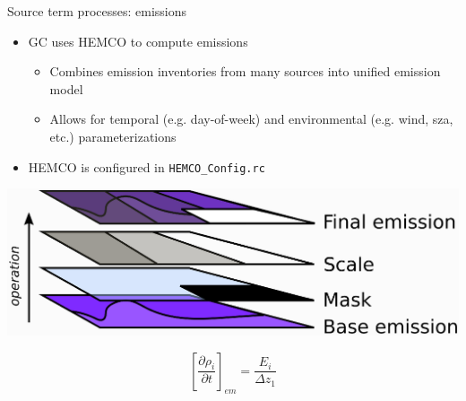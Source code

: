 \documentclass[10pt]{beamer}
\begin{document}
\begin{frame}[fragile]{Source term processes: emissions}
    \begin{itemize}
        \item GC uses HEMCO to compute emissions
        \begin{itemize}
            \item Combines emission inventories from many sources into unified emission model
            \item Allows for temporal (e.g. day-of-week) and environmental (e.g. wind, sza, etc.) parameterizations
        \end{itemize}
        \item HEMCO is configured in \texttt{HEMCO\_Config.rc}
        \vfill
    \end{itemize}
    \begin{minipage}[c]{0.7\textwidth}
        \includegraphics[width=\textwidth]{hemco.eps}
    \end{minipage}
    \begin{minipage}[c]{0.29\textwidth}
        $$
            \left[ \frac{\partial \rho_i}{\partial t} \right]_{em} = \frac{E_i }{\Delta z_1}
        $$
    \end{minipage}
\end{frame}
\end{document}
